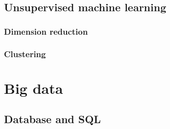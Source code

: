 \documentclass[
]{book}
\begin{document}
\hypertarget{unsupervised-machine-learning}{%
\section{Unsupervised machine learning}\label{unsupervised-machine-learning}}

\hypertarget{dimension-reduction}{%
\subsection{Dimension reduction}\label{dimension-reduction}}

\hypertarget{clustering}{%
\subsection{Clustering}\label{clustering}}

\hypertarget{big_data}{%
\chapter{Big data}\label{big_data}}

\hypertarget{database-and-sql}{%
\section{Database and SQL}\label{database-and-sql}}

  
\end{document}
